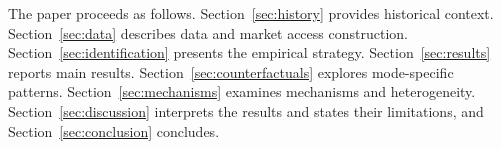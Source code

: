 The paper proceeds as follows. Section~\ref{sec:history} provides
historical context. Section~\ref{sec:data} describes data and market
access construction. Section~\ref{sec:identification} presents the
empirical strategy. Section~\ref{sec:results} reports main results.
Section~\ref{sec:counterfactuals} explores mode-specific patterns.
Section~\ref{sec:mechanisms} examines mechanisms and heterogeneity.
Section~\ref{sec:discussion} interprets the results and states their
limitations, and Section~\ref{sec:conclusion} concludes.
